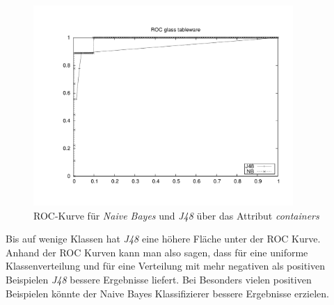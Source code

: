 \begin{figure}[htbp]
	\centering
		\includegraphics[height=3in]{pics/a3/ROC_glass_tableware.pdf}
	\caption{ROC-Kurve f\"ur \emph{Naive Bayes} und \emph{J48} \"uber das Attribut \emph{containers}}
\end{figure}

Bis auf wenige Klassen hat \emph{J48} eine h\"ohere Fl\"ache unter der ROC Kurve.
Anhand der ROC Kurven kann man also sagen, dass f\"ur eine uniforme Klassenverteilung und f\"ur eine Verteilung mit mehr negativen als positiven Beispielen \emph{J48} bessere Ergebnisse liefert. Bei Besonders vielen positiven Beispielen k\"onnte der Naive Bayes Klassifizierer bessere Ergebnisse erzielen.
